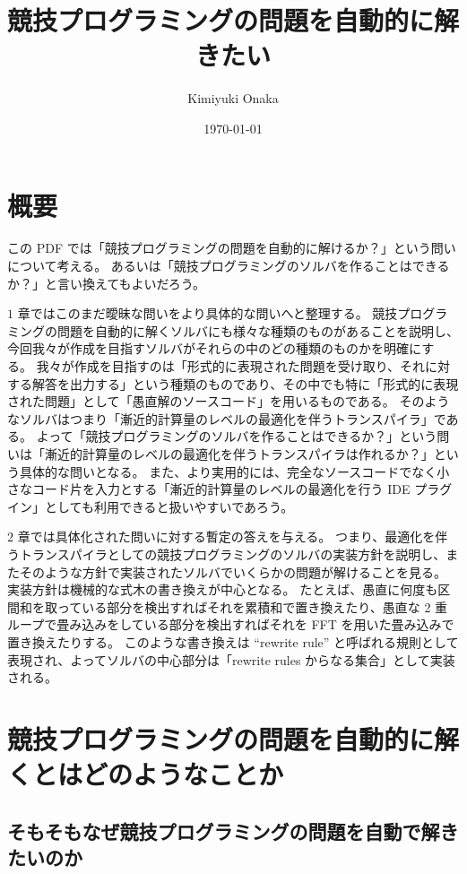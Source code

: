 \documentclass{ltjsarticle}
\title{競技プログラミングの問題を自動的に解きたい}
\author{Kimiyuki Onaka}
\date{\today}
\begin{document}
\maketitle

\setcounter{section}{-1}
\section{概要}

この PDF では「競技プログラミングの問題を自動的に解けるか？」という問いについて考える。
あるいは「競技プログラミングのソルバを作ることはできるか？」と言い換えてもよいだろう。

$1$ 章ではこのまだ曖昧な問いをより具体的な問いへと整理する。
競技プログラミングの問題を自動的に解くソルバにも様々な種類のものがあることを説明し、今回我々が作成を目指すソルバがそれらの中のどの種類のものかを明確にする。
我々が作成を目指すのは「形式的に表現された問題を受け取り、それに対する解答を出力する」という種類のものであり、その中でも特に「形式的に表現された問題」として「愚直解のソースコード」を用いるものである。
そのようなソルバはつまり「漸近的計算量のレベルの最適化を伴うトランスパイラ」である。
よって「競技プログラミングのソルバを作ることはできるか？」という問いは「漸近的計算量のレベルの最適化を伴うトランスパイラは作れるか？」という具体的な問いとなる。
また、より実用的には、完全なソースコードでなく小さなコード片を入力とする「漸近的計算量のレベルの最適化を行う IDE プラグイン」としても利用できると扱いやすいであろう。

$2$ 章では具体化された問いに対する暫定の答えを与える。
つまり、最適化を伴うトランスパイラとしての競技プログラミングのソルバの実装方針を説明し、またそのような方針で実装されたソルバでいくらかの問題が解けることを見る。
実装方針は機械的な式木の書き換えが中心となる。
たとえば、愚直に何度も区間和を取っている部分を検出すればそれを累積和で置き換えたり、愚直な 2 重ループで畳み込みをしている部分を検出すればそれを FFT を用いた畳み込みで置き換えたりする。
このような書き換えは ``rewrite rule'' と呼ばれる規則として表現され、よってソルバの中心部分は「rewrite rules からなる集合」として実装される。

\section{競技プログラミングの問題を自動的に解くとはどのようなことか}

\subsection{そもそもなぜ競技プログラミングの問題を自動で解きたいのか}
\end{document}
